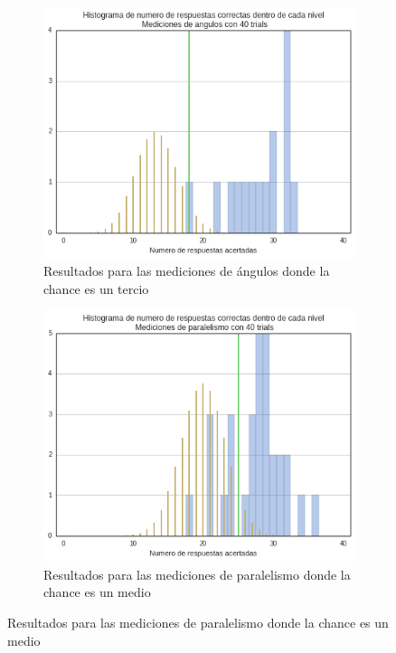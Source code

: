 \documentclass{article}
\begin{document}
	
	\begin{figure}
        \begin{subfigure}{.5\textwidth}
            \centering
            \includegraphics[width=\textwidth]{Imagenes/Exp1_Validas40A.png}
            \caption{Resultados para las mediciones de ángulos donde la chance es un tercio}
            \label{fig:sfig1}
        \end{subfigure}
        \begin{subfigure}{.5\textwidth}
            \centering
            \includegraphics[width=\textwidth]{Imagenes/Exp1_Validas40P.png}
            \caption{Resultados para las mediciones de paralelismo donde la chance es un medio}

\end{subfigure}
\end{figure}
\end{document}
